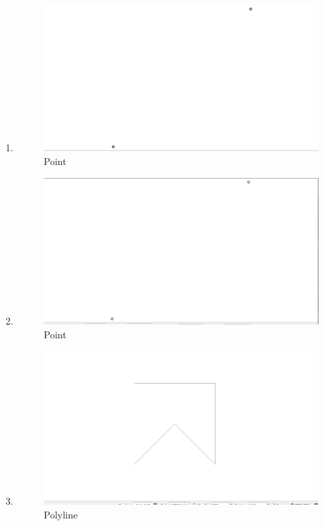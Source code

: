 \begin{enumerate}
	\item 
	
	\begin{figure}[H]
		\includegraphics[width=12cm]{figures/1174039/gambar/hasil3.PNG}
		\centering
		\caption{Point}
	\end{figure}
	
	\item 
	
	\begin{figure}[H]
		\includegraphics[width=12cm]{figures/1174039/gambar/hasil4.PNG}
		\centering
		\caption{Point}
	\end{figure}
	
	\item 
	
	\begin{figure}[H]
		\includegraphics[width=12cm]{figures/1174039/gambar/hasil5.PNG}
		\centering
		\caption{Polyline}
	\end{figure}
	

\end{enumerate}
